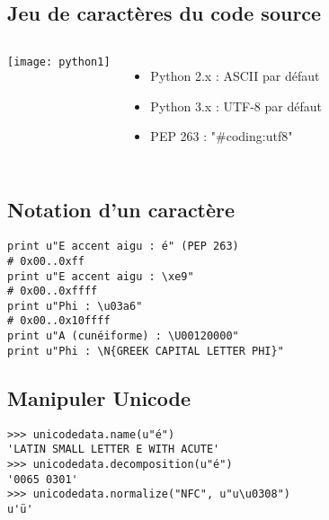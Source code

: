 \subsection{Jeu de caractères du code source}
\frame
{
    \begin{columns}[c]
            \texttt{[image: python1]}
            \begin{itemize}
            \item Python 2.x : ASCII par défaut
            \item Python 3.x : UTF-8 par défaut
            \item PEP 263 : "\#coding:utf8"
            \end{itemize}
    \end{columns}
}

\subsection{Notation d'un caractère}
\begin{frame}[fragile]
    \begin{verbatim}
print u"E accent aigu : é" (PEP 263)
# 0x00..0xff
print u"E accent aigu : \xe9"
# 0x00..0xffff
print u"Phi : \u03a6"
# 0x00..0x10ffff
print u"A (cunéiforme) : \U00120000"
print u"Phi : \N{GREEK CAPITAL LETTER PHI}"
    \end{verbatim}
\end{frame}

\subsection{Manipuler Unicode}
\begin{frame}[fragile]
    \begin{verbatim}
>>> unicodedata.name(u"é")
'LATIN SMALL LETTER E WITH ACUTE'
>>> unicodedata.decomposition(u"é")
'0065 0301'
>>> unicodedata.normalize("NFC", u"u\u0308")
u'ü'
    \end{verbatim}
\end{frame}


